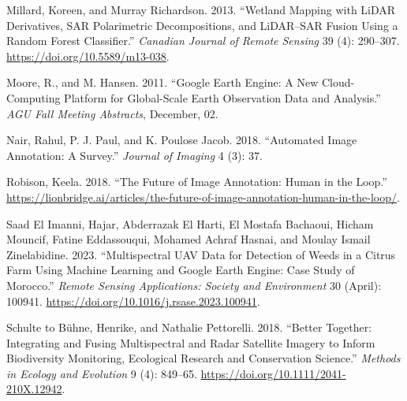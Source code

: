 \documentclass[
  letterpaper,
  DIV=11,
  numbers=noendperiod]{scrreprt}
\newlength{\cslhangindent}
\newlength{\cslentryspacingunit} %
\newenvironment{CSLReferences}[2] %
 {%
  \setlength{\parindent}{0pt}
  \ifodd #1
  \let\oldpar\par
  \def\par{\hangindent=\cslhangindent\oldpar}
  \fi
  \setlength{\parskip}{#2\cslentryspacingunit}
 }%
 {}
\begin{document}
\begin{CSLReferences}{1}{0}
\leavevmode{}%
Millard, Koreen, and Murray Richardson. 2013. {``Wetland Mapping with
{LiDAR} Derivatives, {SAR} Polarimetric Decompositions, and
{LiDAR}--{SAR} Fusion Using a Random Forest Classifier.''}
\emph{Canadian Journal of Remote Sensing} 39 (4): 290--307.
\url{https://doi.org/10.5589/m13-038}.

\leavevmode{}%
Moore, R., and M. Hansen. 2011. {``Google {Earth} {Engine}: A New
Cloud-Computing Platform for Global-Scale Earth Observation Data and
Analysis.''} \emph{AGU Fall Meeting Abstracts}, December, 02.

\leavevmode{}%
Nair, Rahul, P. J. Paul, and K. Poulose Jacob. 2018. {``Automated Image
Annotation: A Survey.''} \emph{Journal of Imaging} 4 (3): 37.

\leavevmode{}%
Robison, Keela. 2018. {``The Future of Image Annotation: Human in the
Loop.''}
\url{https://lionbridge.ai/articles/the-future-of-image-annotation-human-in-the-loop/}.

\leavevmode{}%
Saad El Imanni, Hajar, Abderrazak El Harti, El Mostafa Bachaoui, Hicham
Mouncif, Fatine Eddassouqui, Mohamed Achraf Hasnai, and Moulay Ismail
Zinelabidine. 2023. {``Multispectral {UAV} Data for Detection of Weeds
in a Citrus Farm Using Machine Learning and {Google} {Earth} {Engine}:
{Case} Study of {Morocco}.''} \emph{Remote Sensing Applications: Society
and Environment} 30 (April): 100941.
\url{https://doi.org/10.1016/j.rsase.2023.100941}.

\leavevmode{}%
Schulte to Bühne, Henrike, and Nathalie Pettorelli. 2018. {``Better
Together: {Integrating} and Fusing Multispectral and Radar Satellite
Imagery to Inform Biodiversity Monitoring, Ecological Research and
Conservation Science.''} \emph{Methods in Ecology and Evolution} 9 (4):
849--65. \url{https://doi.org/10.1111/2041-210X.12942}.

\end{CSLReferences}
\end{document}
